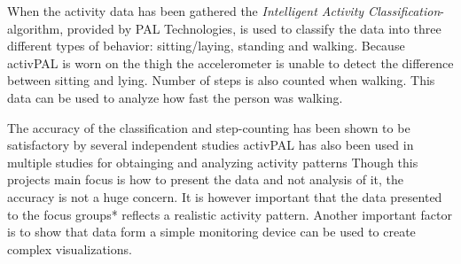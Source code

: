 When the activity data has been gathered the \emph{Intelligent Activity Classification}-algorithm, provided by PAL Technologies, is used to classify the data into three different types of behavior: sitting/laying, standing and walking. Because activPAL is worn on the thigh the accelerometer is unable to detect the difference between sitting and lying. Number of steps is also counted when walking. This data can be used to analyze how fast the person was walking.

The accuracy of the classification and step-counting has been shown to be satisfactory by several independent studies %
activPAL has also been used in multiple studies for obtainging and analyzing activity patterns %
Though this projects main focus is how to present the data and not analysis of it, the accuracy is not a huge concern. It is however important that the data presented to the focus groups* reflects a realistic activity pattern. Another important factor is to show that data form a simple monitoring device can be used to create complex visualizations.



